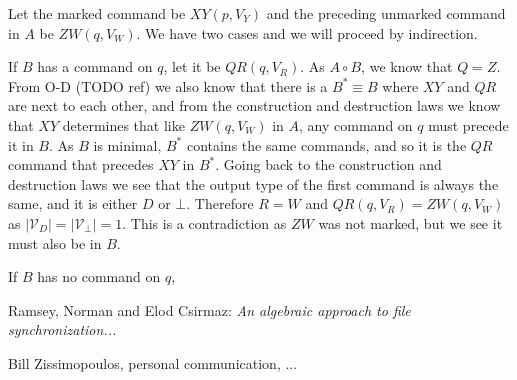 \documentclass[12pt]{article}
\newcommand{\setvx}[1]{\mathcal{V}_{#1}}
\newcommand{\setd}{\setvx{D}}
\newcommand{\setb}{\setvx{\empt}}
\newcommand{\empt}{\bot}
\newcommand{\fscommand}[2]{{#1#2}}
\newcommand{\cxy}{\fscommand{X}{Y}}
\newcommand{\czw}{\fscommand{Z}{W}}
\newcommand{\cqr}{\fscommand{Q}{R}}
\begin{document}
Let the marked command be $\cxy(p, V_Y)$ and the preceding unmarked command in $A$ be $\czw(q, V_W)$.
We have two cases and we will proceed by indirection.

If $B$ has a command on $q$, let it be $\cqr(q, V_R)$. As $A\circ B$, we know
that $Q=Z$. From 
O-D (TODO ref)
we also know that there is a $B^*\equiv B$ where $\cxy$ and $\cqr$ are next to each other,
and from the construction and destruction laws we know that $\cxy$ determines that like
$\czw(q, V_W)$ in $A$, any command on $q$ must precede it in $B$. As $B$ is minimal, $B^*$
contains the same commands, and so it is the $\cqr$ command that precedes $\cxy$ in $B^*$.
Going back to the construction and destruction laws we see that the output type of the first command
is always the same, and it is either $D$ or $\empt$. Therefore $R=W$ and $\cqr(q, V_R)=\czw(q, V_W)$
as $|\setd|=|\setb|=1$. This is a contradiction as $\czw$ was not marked, but we see it must also be in $B$.

If $B$ has no command on $q$, 



\begin{thebibliography}{99}

 Ramsey, Norman and Elod Csirmaz: {\it An algebraic approach to
file synchronization...}

 Bill Zissimopoulos, personal communication, ...

\end{thebibliography}
\end{document}
